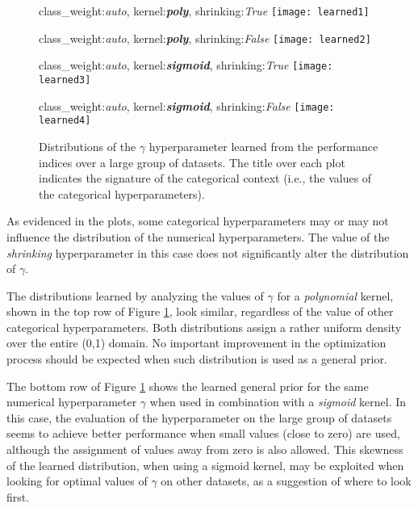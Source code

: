 \begin{figure}
	\begin{minipage}[t]{.48\textwidth}
		\centering
		\footnotesize class\_weight:\emph{auto}, kernel:{\bf \emph{poly}}, shrinking:\emph{True}
		\texttt{[image: learned1]}
	\end{minipage}
	\hfill
	\begin{minipage}[t]{.48\textwidth}
		\centering
		\footnotesize class\_weight:\emph{auto}, kernel:{\bf \emph{poly}}, shrinking:\emph{False}
		\texttt{[image: learned2]}
	\end{minipage}
	\vskip0.6cm
	\begin{minipage}[t]{.48\textwidth}
		\centering
		\footnotesize class\_weight:\emph{auto}, kernel:{\bf \emph{sigmoid}}, shrinking:\emph{True}
		\texttt{[image: learned3]}
	\end{minipage}
	\hfill
	\begin{minipage}[t]{.48\textwidth}
		\centering
		\footnotesize class\_weight:\emph{auto}, kernel:{\bf \emph{sigmoid}}, shrinking:\emph{False}
		\texttt{[image: learned4]}
	\end{minipage}
	\caption[Learned general priors]{Distributions of the $\gamma$ hyperparameter learned from the performance indices over
	a large group of datasets. The title over each plot indicates the signature of the categorical context (i.e., the values of the
	categorical hyperparameters).} \label{img:learned1}
	\label{fig:learned_gamma}
\end{figure}

As evidenced in the plots, some categorical hyperparameters may or may not influence the distribution of
the numerical hyperparameters. The value of the \emph{shrinking} hyperparameter in this case does
not significantly alter the distribution of $\gamma$.

The distributions learned by analyzing the values of $\gamma$ for a \emph{polynomial} kernel, shown in
the top row of Figure \ref{fig:learned_gamma}, look similar, regardless of the value of other categorical
hyperparameters. Both distributions assign a rather uniform density over the entire (0,1)
domain. No important improvement in the optimization process should be expected when such
distribution is used as a general prior.

The bottom row of Figure \ref{fig:learned_gamma} shows the learned general prior for the same numerical
hyperparameter $\gamma$ when used in combination with a \emph{sigmoid} kernel. In this case, the evaluation of the
hyperparameter on the large group of datasets seems to achieve better performance when small
values (close to zero) are used, although the assignment of values away from zero is also allowed.
This skewness of the learned distribution, when using a sigmoid kernel, may be exploited when looking for
optimal values of $\gamma$ on other datasets, as a suggestion of where to look first.
